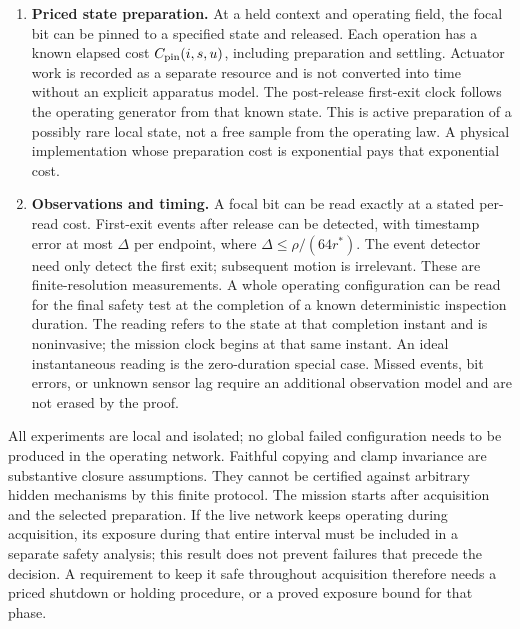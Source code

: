 \documentclass[11pt]{article}
\begin{document}
\begin{enumerate}
\item \textbf{Priced state preparation.} At a held context and operating field, the focal bit can be pinned to a specified state and released. Each operation has a known elapsed cost $C_{\rm pin}(i,s,u)$, including preparation and settling. Actuator work is recorded as a separate resource and is not converted into time without an explicit apparatus model. The post-release first-exit clock follows the operating generator from that known state. This is active preparation of a possibly rare local state, not a free sample from the operating law. A physical implementation whose preparation cost is exponential pays that exponential cost.
\item \textbf{Observations and timing.} A focal bit can be read exactly at a stated per-read cost. First-exit events after release can be detected, with timestamp error at most $\Delta$ per endpoint, where $\Delta\le\rho/(64r^*)$. The event detector need only detect the first exit; subsequent motion is irrelevant. These are finite-resolution measurements. A whole operating configuration can be read for the final safety test at the completion of a known deterministic inspection duration. The reading refers to the state at that completion instant and is noninvasive; the mission clock begins at that same instant. An ideal instantaneous reading is the zero-duration special case. Missed events, bit errors, or unknown sensor lag require an additional observation model and are not erased by the proof.
\end{enumerate}
All experiments are local and isolated; no global failed configuration needs to be produced in the operating network. Faithful copying and clamp invariance are substantive closure assumptions. They cannot be certified against arbitrary hidden mechanisms by this finite protocol. The mission starts after acquisition and the selected preparation. If the live network keeps operating during acquisition, its exposure during that entire interval must be included in a separate safety analysis; this result does not prevent failures that precede the decision. A requirement to keep it safe throughout acquisition therefore needs a priced shutdown or holding procedure, or a proved exposure bound for that phase.
\end{document}
